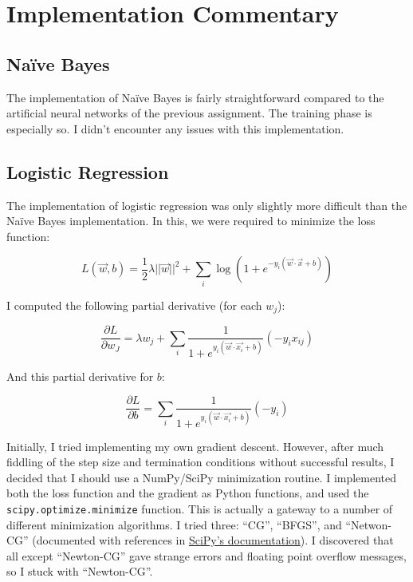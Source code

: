 \documentclass[fleqn]{homework}
\begin{document}
  \maketitle

  \section{Implementation Commentary}

  \subsection{Na\"{i}ve Bayes}

  The implementation of Na\"{i}ve Bayes is fairly straightforward compared to
  the artificial neural networks of the previous assignment.  The training phase
  is especially so.  I didn't encounter any issues with this implementation.

  \subsection{Logistic Regression}

  The implementation of logistic regression was only slightly more difficult
  than the Na\"ive Bayes implementation.  In this, we were required to minimize
  the loss function:

  \begin{equation}
    L(\vec{w},b) = \frac{1}{2} \lambda ||\vec{w}||^2 + \sum_{i} \log \left(1 + e^{-y_i(\vec{w}\cdot\vec{x} + b)}\right)
  \end{equation}

  I computed the following partial derivative (for each $w_j$):

  \begin{equation}
    \frac{\partial L}{\partial w_J} = \lambda w_j + \sum_{i} \frac{1}{1 + e^{y_i(\vec{w}\cdot\vec{x_i} + b)}} (-y_i x_{ij})
  \end{equation}

  And this partial derivative for $b$:

  \begin{equation}
    \frac{\partial L}{\partial b} = \sum_{i} \frac{1}{1 + e^{y_i(\vec{w}\cdot\vec{x_i} + b)}} (-y_i)
  \end{equation}

  Initially, I tried implementing my own gradient descent.  However, after much
  fiddling of the step size and termination conditions without successful
  results, I decided that I should use a NumPy/SciPy minimization routine.  I
  implemented both the loss function and the gradient as Python functions, and
  used the \texttt{scipy.optimize.minimize} function.  This is actually a
  gateway to a number of different minimization algorithms.  I tried three:
  ``CG'', ``BFGS'', and ``Netwon-CG'' (documented with references in
  \href{https://docs.scipy.org/doc/scipy/reference/generated/scipy.optimize.minimize.html}{SciPy's
    documentation}).  I discovered that all except ``Newton-CG'' gave strange
  errors and floating point overflow messages, so I stuck with ``Newton-CG''.
\end{document}

